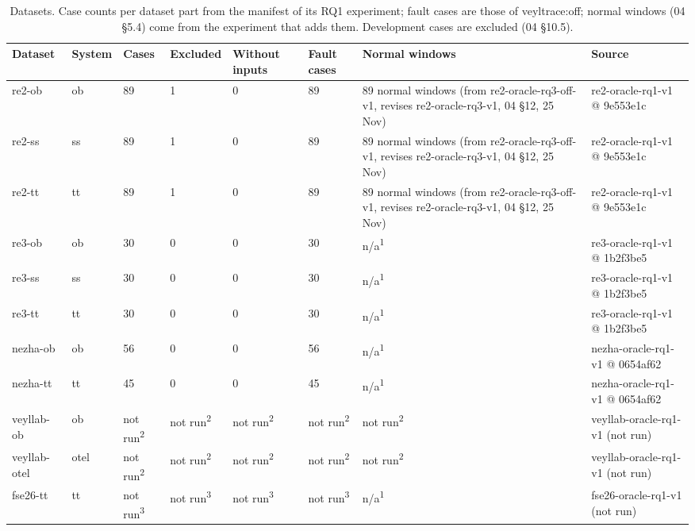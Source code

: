 \begin{table}[t]
\centering
\caption{Datasets. Case counts per dataset part from the manifest of its RQ1 experiment; fault cases are those of veyltrace:off; normal windows (04 \S{}5.4) come from the experiment that adds them. Development cases are excluded (04 \S{}10.5).}
\label{tab:t03-datasets}
\small
\begin{tabular}{llllllll}
\hline
Dataset & System & Cases & Excluded & Without inputs & Fault cases & Normal windows & Source \\
\hline
re2-ob & ob & 89 & 1 & 0 & 89 & 89 normal windows (from re2-oracle-rq3-off-v1, revises re2-oracle-rq3-v1, 04 \S{}12, 25 Nov) & re2-oracle-rq1-v1 @ 9e553e1c \\
re2-ss & ss & 89 & 1 & 0 & 89 & 89 normal windows (from re2-oracle-rq3-off-v1, revises re2-oracle-rq3-v1, 04 \S{}12, 25 Nov) & re2-oracle-rq1-v1 @ 9e553e1c \\
re2-tt & tt & 89 & 1 & 0 & 89 & 89 normal windows (from re2-oracle-rq3-off-v1, revises re2-oracle-rq3-v1, 04 \S{}12, 25 Nov) & re2-oracle-rq1-v1 @ 9e553e1c \\
re3-ob & ob & 30 & 0 & 0 & 30 & n/a\textsuperscript{1} & re3-oracle-rq1-v1 @ 1b2f3be5 \\
re3-ss & ss & 30 & 0 & 0 & 30 & n/a\textsuperscript{1} & re3-oracle-rq1-v1 @ 1b2f3be5 \\
re3-tt & tt & 30 & 0 & 0 & 30 & n/a\textsuperscript{1} & re3-oracle-rq1-v1 @ 1b2f3be5 \\
nezha-ob & ob & 56 & 0 & 0 & 56 & n/a\textsuperscript{1} & nezha-oracle-rq1-v1 @ 0654af62 \\
nezha-tt & tt & 45 & 0 & 0 & 45 & n/a\textsuperscript{1} & nezha-oracle-rq1-v1 @ 0654af62 \\
veyllab-ob & ob & not run\textsuperscript{2} & not run\textsuperscript{2} & not run\textsuperscript{2} & not run\textsuperscript{2} & not run\textsuperscript{2} & veyllab-oracle-rq1-v1 (not run) \\
veyllab-otel & otel & not run\textsuperscript{2} & not run\textsuperscript{2} & not run\textsuperscript{2} & not run\textsuperscript{2} & not run\textsuperscript{2} & veyllab-oracle-rq1-v1 (not run) \\
fse26-tt & tt & not run\textsuperscript{3} & not run\textsuperscript{3} & not run\textsuperscript{3} & not run\textsuperscript{3} & n/a\textsuperscript{1} & fse26-oracle-rq1-v1 (not run) \\

\end{tabular}
\end{table}
